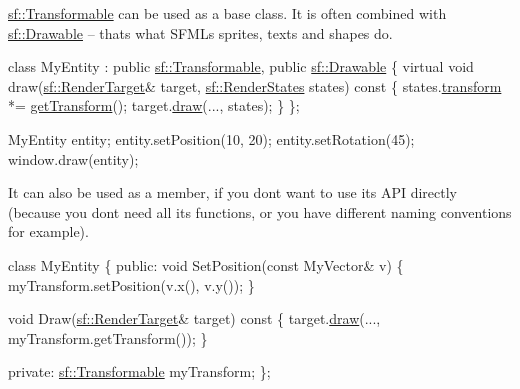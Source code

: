 \hyperlink{classsf_1_1_transformable}{sf\+::\+Transformable} can be used as a base class. It is often combined with \hyperlink{classsf_1_1_drawable}{sf\+::\+Drawable} -- that\textquotesingle{}s what S\+F\+ML\textquotesingle{}s sprites, texts and shapes do. 
\begin{DoxyCode}
\textcolor{keyword}{class }MyEntity : \textcolor{keyword}{public} \hyperlink{classsf_1_1_transformable}{sf::Transformable}, \textcolor{keyword}{public} \hyperlink{classsf_1_1_drawable}{sf::Drawable}
\{
    \textcolor{keyword}{virtual} \textcolor{keywordtype}{void} draw(\hyperlink{classsf_1_1_render_target}{sf::RenderTarget}& target, \hyperlink{classsf_1_1_render_states}{sf::RenderStates} states)\textcolor{keyword}{
       const}
\textcolor{keyword}{    }\{
        states.\hyperlink{classsf_1_1_render_states_a1f737981a0f2f0d4bb8dac866a8d1149}{transform} *= \hyperlink{classsf_1_1_transformable_a7f7c3f0bab3f162b13613904fbdbb9ad}{getTransform}();
        target.\hyperlink{classsf_1_1_render_target_a12417a3bcc245c41d957b29583556f39}{draw}(..., states);
    \}
\};

MyEntity entity;
entity.setPosition(10, 20);
entity.setRotation(45);
window.draw(entity);
\end{DoxyCode}


It can also be used as a member, if you don\textquotesingle{}t want to use its A\+PI directly (because you don\textquotesingle{}t need all its functions, or you have different naming conventions for example). 
\begin{DoxyCode}
\textcolor{keyword}{class }MyEntity
\{
\textcolor{keyword}{public}:
    \textcolor{keywordtype}{void} SetPosition(\textcolor{keyword}{const} MyVector& v)
    \{
        myTransform.setPosition(v.x(), v.y());
    \}

    \textcolor{keywordtype}{void} Draw(\hyperlink{classsf_1_1_render_target}{sf::RenderTarget}& target)\textcolor{keyword}{ const}
\textcolor{keyword}{    }\{
        target.\hyperlink{classsf_1_1_render_target_a12417a3bcc245c41d957b29583556f39}{draw}(..., myTransform.getTransform());
    \}

\textcolor{keyword}{private}:
    \hyperlink{classsf_1_1_transformable}{sf::Transformable} myTransform;
\};
\end{DoxyCode}



